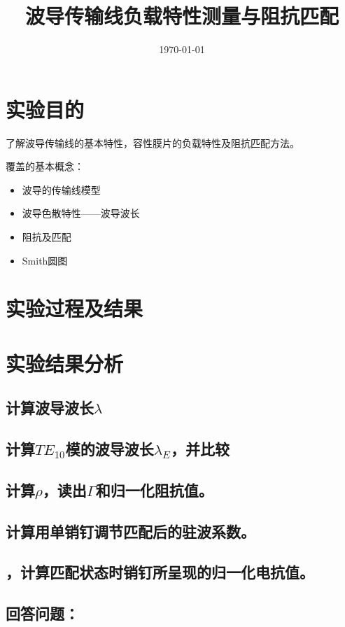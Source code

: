 \documentclass{../source/Experiment}
\title{波导传输线负载特性测量与阻抗匹配}
\date{\today}
\begin{document}
    \makecover
    \makeheader

    \section{实验目的}
    了解波导传输线的基本特性，容性膜片的负载特性及阻抗匹配方法。
    
    覆盖的基本概念：
    \begin{itemize}
        \item 波导的传输线模型
        \item 波导色散特性——波导波长
        \item 阻抗及匹配
        \item Smith圆图
    \end{itemize}

    \section{实验过程及结果}

    \section{实验结果分析}
        \subsection{计算波导波长$\lambda$}
        \subsection{计算$TE_{10}$模的波导波长$\lambda_E$，并比较}
        \subsection{计算$\rho $，读出$\Gamma $和归一化阻抗值。}
        \subsection{计算用单销钉调节匹配后的驻波系数。}
        \subsection{，计算匹配状态时销钉所呈现的归一化电抗值。}

        \subsection{回答问题：}
            \subsubsection{}
\end{document}
